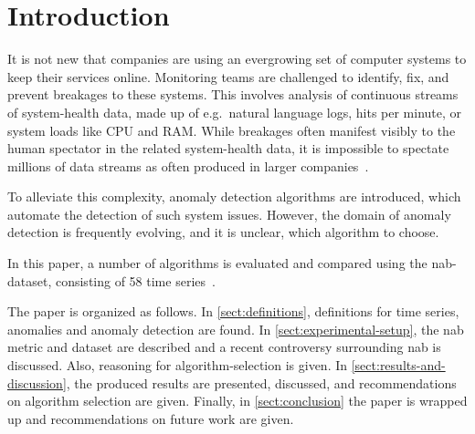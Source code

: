 \section{Introduction}
It is not new that companies are using an evergrowing set of computer systems
to keep their services online. Monitoring teams are challenged to identify, fix,
and prevent breakages to these systems. This involves analysis of continuous
streams of system-health data, made up of e.g.\ natural language logs, hits per
minute, or system loads like CPU and RAM\@. While breakages often manifest visibly
to the human spectator in the related system-health data, it is impossible to spectate
millions of data streams as often produced in larger companies~\cite[cf.][]{Zhu.2017}.

To alleviate this complexity, anomaly detection algorithms are introduced,
which automate the detection of such system issues. However, the domain of
anomaly detection is frequently evolving, and it is unclear, which algorithm to
choose.

In this paper, a number of algorithms is evaluated and compared using the
\gls{nab}-dataset, consisting of 58 time series~\cite{Lavin.2015}.

The paper is organized as follows. In \cref{sect:definitions}, definitions for
time series, anomalies and anomaly detection are found. In \cref{sect:experimental-setup},
the \gls{nab} metric and dataset are described and a recent controversy surrounding
\gls{nab} is discussed. Also, reasoning for algorithm-selection is given.
In \cref{sect:results-and-discussion}, the produced results are presented, discussed,
and recommendations on algorithm selection are given. Finally, in \cref{sect:conclusion}
the paper is wrapped up and recommendations on future work are given.